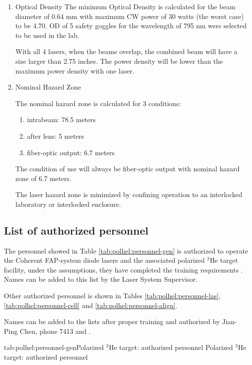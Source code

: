 {\begin {enumerate}
\item {Optical Density}
The minimum Optical Density is calculated for the beam diameter of 0.64 mm
with maximum CW power of 30 watts (the worst case) to be 4.70. 
OD of 5 safety goggles for the wavelength of 795 nm were selected to be used in the lab.

With all 4 lasers, when the beams overlap, the 
combined beam will have a size larger than 2.75 inches. The power density 
will be lower than the maximum power density with one laser. 

\item {Nominal Hazard Zone}

The nominal hazard zone is calculated for 3 conditions:
\begin{enumerate}
\item {} intrabeam: 78.5 meters
\item {} after lens: 5 meters
\item {} fiber-optic output: 6.7 meters
\end{enumerate}
The condition of use will always be fiber-optic output with nominal hazard
zone of 6.7 meters.

The laser hazard zone is minimized by confining operation to an interlocked 
laboratory or interlocked enclosure.
\end{enumerate}

} %

\begin{safetyen}{10}{5}
\section{List of authorized personnel}
\end{safetyen}

The personnel showed in Table \ref{tab:polhel:personnel-gen} is 
authorized to operate the Coherent FAP-system
diode lasers and the associated polarized $^3$He target facility, under 
the assumptions, they
have completed the training requirements%
.
Names can be added to this list by the Laser System Supervisor.

Other authorized personnel is shown in Tables \ref{tab:polhel:personnel-las},
\ref{tab:polhel:personnel-cell} and \ref{tab:polhel:personnel-align}.

Names can be added to the lists after proper training 
and authorized by Jian-Ping Chen, phone 7413 and
.

\begin{namestab}{tab:polhel:personnel-gen}{Polarized $^3$He target: authorized personnel}{%
   Polarized $^3$He target: authorized personnel}
   \EdFolts{}
   \GaryDezern{}
   \ScotSpiegel{}
   \MarkStevens{}
   \ToddAverett{}
   \GordonCates{}
   \AlexandreDeur{}
   \ChiranjibDutta{}
   \HaiyanGao{}
   \OleHansen{}
   \JinHuang {}
   \JoeKatich{}
   \WolfgangKorsch{}
   \NilangaLiyanage{}
   \ZeinEddineMeziani{}
   \YiQiang{}
   \KarlSlifer{}
   \PatriciaSolvignon{}
   \VinceSulkosky{}
   \YiZhang{}
   \XiaohuiZhan{}
   \XiaochaoZheng{}
\end{namestab}

